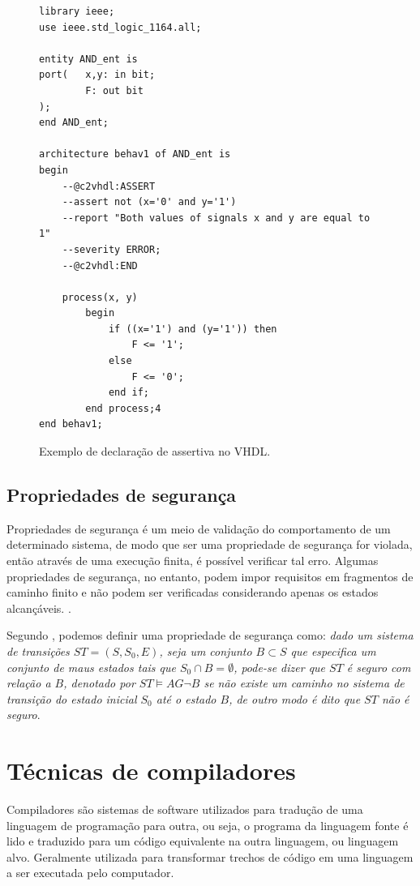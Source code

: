 \begin{figure}[thp]
\caption{\label{fig:assertiva} Exemplo de declaração de assertiva no VHDL.}
	\begin{center}
    \begin{minipage}{0.9\textwidth}
    \begin{lstlisting}       
library ieee;
use ieee.std_logic_1164.all;

entity AND_ent is
port(   x,y: in bit;
        F: out bit
);
end AND_ent;

architecture behav1 of AND_ent is
begin
	--@c2vhdl:ASSERT
    --assert not (x='0' and y='1')
    --report "Both values of signals x and y are equal to 1"
    --severity ERROR;
    --@c2vhdl:END

	process(x, y)
    	begin
        	if ((x='1') and (y='1')) then
            	F <= '1';
        	else
            	F <= '0';
        	end if;
    	end process;4
end behav1;

\end{lstlisting}
    \end{minipage}
	\end{center}
\end{figure}
\subsection{Propriedades de segurança}
Propriedades de segurança é um meio de validação do comportamento de um determinado sistema, de modo que ser uma propriedade de segurança for violada, então através de uma execução finita, é possível verificar tal erro. Algumas propriedades de segurança, no entanto, podem impor requisitos em fragmentos de caminho finito e não podem ser verificadas considerando apenas os estados alcançáveis. \cite{baier2008principles}.

\par
Segundo \cite{clarke2003verification}, podemos definir uma propriedade de segurança como: \textit{dado um sistema de transições $ST = (S, S_0, E)$, seja um conjunto $B \subset S$ que especifica um conjunto de maus estados tais que $S_0 \cap B = \emptyset$, pode-se dizer que $ST$ é seguro com relação a $B$, denotado por $ST \models AG\neg B$ se não existe um caminho no sistema de transição do estado inicial $S_0$ até o estado $B$, de outro modo é dito que $ST$ não é seguro}.
\section{Técnicas de compiladores}
\par
Compiladores são sistemas de software utilizados para tradução de uma linguagem de programação para outra, ou seja, o programa da linguagem fonte é lido e traduzido para um código equivalente na outra linguagem, ou linguagem alvo. Geralmente utilizada para transformar trechos de código em uma linguagem a ser executada pelo computador\cite{aho2007compilers}. 

